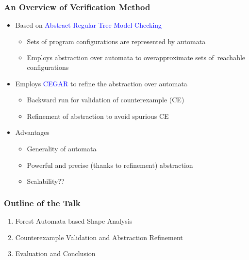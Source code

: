 \documentclass{beamer}
\newcommand{\hlbl}[1]{\textcolor{blue}{#1}}
\newcommand{\hlgr}[1]{\textcolor{olive!50!green}{#1}}
\begin{document}
\begin{frame}
  \frametitle{An Overview of Verification Method}
   \begin{itemize}
      \item Based on \hlbl{Abstract Regular Tree Model Checking} 
		\begin{itemize}
			\item Sets of program configurations are represented by automata
			\item Employs abstraction over automata to overapproximate sets of~reachable configurations
		\end{itemize}
	   \item Employs \hlbl{CEGAR} to refine the abstraction over automata
		   \begin{itemize}
			    \item Backward run for validation of counterexample (CE)
				\item Refinement of abstraction to avoid spurious CE
		   \end{itemize}
	   \item \hlgr{Advantages}
	   \begin{itemize}
		 \item Generality of automata
		 \item Powerful and precise (thanks to refinement) abstraction
		 \item Scalability??
	   \end{itemize}
  \end{itemize}
\end{frame}

\begin{frame}
\frametitle{Outline of the Talk}

	\begin{enumerate}
		\item Forest Automata based Shape Analysis
		\item Counterexample Validation and Abstraction Refinement
		\item Evaluation and Conclusion
	\end{enumerate}

\end{frame}

\end{document}
